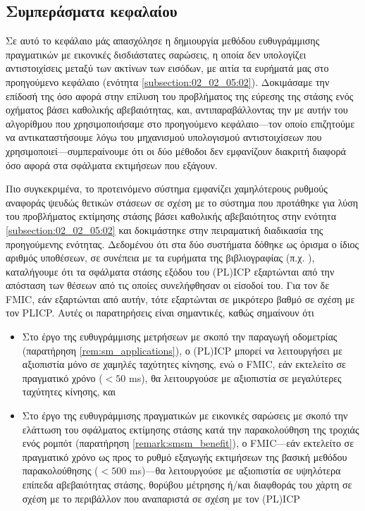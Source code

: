 \subsection{Συμπεράσματα κεφαλαίου}
\label{subsection:02_03_05:01}

Σε αυτό το κεφάλαιο μάς απασχόλησε η δημιουργία μεθόδου ευθυγράμμισης
πραγματικών με εικονικές δισδιάστατες σαρώσεις, η οποία δεν υπολογίζει
αντιστοιχίσεις μεταξύ των ακτίνων των εισόδων, με αιτία τα ευρήματά μας στο
προηγούμενο κεφάλαιο (ενότητα \ref{subsection:02_02_05:02}). Δοκιμάσαμε την
επίδοσή της όσο αφορά στην επίλυση του προβλήματος της εύρεσης της στάσης ενός
οχήματος βάσει καθολικής αβεβαιότητας, και, αντιπαραβάλλοντας την με αυτήν του
αλγορίθμου που χρησιμοποιήσαμε στο προηγούμενο κεφάλαιο---τον οποίο επιζητούμε
να αντικαταστήσουμε λόγω του μηχανισμού υπολογισμού αντιστοιχίσεων που
χρησιμοποιεί---συμπεραίνουμε ότι οι δύο μέθοδοι δεν εμφανίζουν διακριτή διαφορά
όσο αφορά στα σφάλματα εκτιμήσεων που εξάγουν.

Πιο συγκεκριμένα, το προτεινόμενο σύστημα εμφανίζει χαμηλότερους ρυθμούς
αναφοράς ψευδώς θετικών στάσεων σε σχέση με το σύστημα που προτάθηκε για λύση
του προβλήματος εκτίμησης στάσης βάσει καθολικής αβεβαιότητος στην ενότητα
\ref{subsection:02_02_05:02} και δοκιμάστηκε στην πειραματική διαδικασία της
προηγούμενης ενότητας. Δεδομένου ότι στα δύο συστήματα δόθηκε ως όρισμα ο ίδιος
αριθμός υποθέσεων, σε συνέπεια με τα ευρήματα της βιβλιογραφίας (π.χ.
\cite{Olson2009a,bernreiter2021phaser}), καταλήγουμε ότι τα σφάλματα στάσης
εξόδου του (PL)ICP εξαρτώνται από την απόσταση των θέσεων από τις οποίες
συνελήφθησαν οι είσοδοί του. Για τον δε FMIC, εάν εξαρτώνται από αυτήν, τότε
εξαρτώνται σε μικρότερο βαθμό σε σχέση με τον PLICP. Αυτές οι παρατηρήσεις είναι
σημαντικές, καθώς σημαίνουν ότι

\begin{itemize}
  \item Στο έργο της ευθυγράμμισης μετρήσεων με σκοπό την παραγωγή οδομετρίας
        (παρατήρηση \ref{rem:sm_applications}), ο (PL)ICP μπορεί να λειτουργήσει
        με αξιοπιστία μόνο σε χαμηλές ταχύτητες κίνησης, ενώ ο FMIC, εάν
        εκτελείτο σε πραγματικό χρόνο ($< 50$ ms), θα λειτουργούσε με αξιοπιστία
        σε μεγαλύτερες ταχύτητες κίνησης, και
  \item Στο έργο της ευθυγράμμισης πραγματικών με εικονικές σαρώσεις με σκοπό
        την ελάττωση του σφάλματος εκτίμησης στάσης κατά την παρακολούθηση
        της τροχιάς ενός ρομπότ (παρατήρηση \ref{remark:smsm_benefit}), ο
        FMIC---εάν εκτελείτο σε πραγματικό χρόνο ως προς το ρυθμό εξαγωγής
        εκτιμήσεων της βασική μεθόδου παρακολούθησης ($< 500$ ms)---θα
        λειτουργούσε με αξιοπιστία σε υψηλότερα επίπεδα αβεβαιότητας στάσης,
        θορύβου μέτρησης ή/και διαφθοράς του χάρτη σε σχέση με το περιβάλλον
        που αναπαριστά σε σχέση με τον (PL)ICP
\end{itemize}

